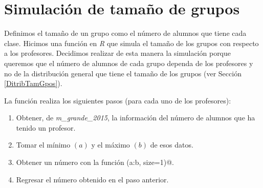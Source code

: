 


\section{Simulación de tamaño de grupos} \label{SimTamGpos}

Definimos el tamaño de un grupo como el número de alumnos que tiene cada clase. Hicimos una función en \textit{R} que simula el tamaño de los grupos con respecto a los profesores. Decidimos realizar de esta manera la simulación porque queremos que el número de alumnos de cada grupo dependa de los profesores y no de la distribución general que tiene el tamaño de los grupos (ver Sección \ref{DitribTamGpos}). %

La función realiza los siguientes pasos (para cada uno de los profesores):
  
\begin{enumerate}

\item Obtener, de \textit{m\_grande\_2015}, la información del número de alumnos que ha tenido un profesor.

\item Tomar el mínimo $(a)$ y el máximo $(b)$ de esos datos.

\item Obtener un número con la función \verb@sample(a:b, size=1)@.

\item Regresar el número obtenido en el paso anterior.
\end{enumerate}




